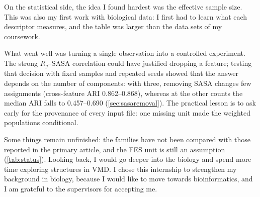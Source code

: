On the statistical side, the idea I found hardest was the effective sample size. This was also my first work with biological data: I first had to learn what each descriptor measures, and the table was larger than the data sets of my coursework.

What went well was turning a single observation into a controlled experiment. The strong $R_g$--SASA correlation could have justified dropping a feature; testing that decision with fixed samples and repeated seeds showed that the answer depends on the number of components: with three, removing SASA changes few assignments (cross-feature ARI 0.862--0.868), whereas at the other counts the median ARI falls to 0.457--0.690 (\cref{sec:sasaremoval}). The practical lesson is to ask early for the provenance of every input file: one missing unit made the weighted populations conditional.

Some things remain unfinished: the families have not been compared with those reported in the primary article, and the FES unit is still an assumption (\cref{tab:status}). Looking back, I would go deeper into the biology and spend more time exploring structures in VMD. I chose this internship to strengthen my background in biology, because I would like to move towards bioinformatics, and I am grateful to the supervisors for accepting me.
